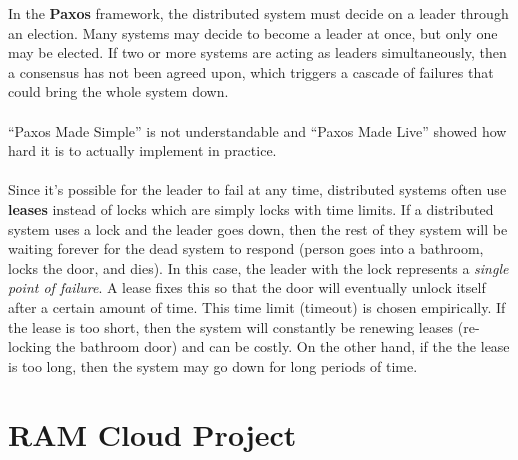 \documentclass[twoside]{article}
\begin{document}
In the \textbf{Paxos} framework, the distributed system must decide on a leader through an election.  Many systems may decide to become a leader at once, but only one may be elected.  If two or more systems are acting as leaders simultaneously, then a consensus has not been agreed upon, which triggers a cascade of failures that could bring the whole system down.\\
\\
``Paxos Made Simple'' is not understandable and ``Paxos Made Live'' showed how hard it is to actually implement in practice.\\
\\
Since it's possible for the leader to fail at any time, distributed systems often use \textbf{leases} instead of locks which are simply locks with time limits.  If a distributed system uses a lock and the leader goes down, then the rest of they system will be waiting forever for the dead system to respond (person goes into a bathroom, locks the door, and dies).  In this case, the leader with the lock represents a {\em single point of failure}.  A lease fixes this so that the door will eventually unlock itself after a certain amount of time.  This time limit (timeout) is chosen empirically.  If the lease is too short, then the system will constantly be renewing leases (re-locking the bathroom door) and can be costly.  On the other hand, if the the lease is too long, then the system may go down for long periods of time.

\section{RAM Cloud Project}
\end{document}
